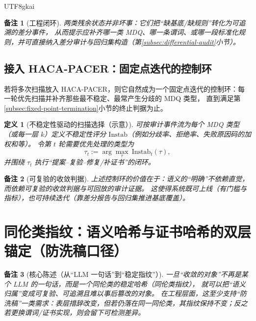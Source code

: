 \documentclass[12pt]{article}
\newtheorem{definition}{定义}[section]
\newtheorem{remark}{备注}[section]
\begin{document}
\begin{CJK*}{UTF8}{gkai}
\begin{remark}[工程闭环]
两类残余状态并非坏事：它们把“缺基底/缺规则”转化为可追溯的差分事件，
从而提示应补齐哪一类 MDQ、哪一条谓词、或哪一段标准化规则，并可直接纳入差分审计与回归集构造（第\ref{subsec:differential-audit}小节）。
\end{remark}

\subsection{接入 HACA-PACER：固定点迭代的控制环}
\label{subsec:haca-pacer-fixed-point-loop}

若将多次扫描放入 HACA-PACER，则它自然成为一个固定点迭代的控制环：每一轮优先扫描并补齐那些最不稳定、最常产生分歧的 MDQ 类型，
直到满足第\ref{subsec:fixed-point-termination}小节的终止判据为止。

\begin{definition}[不稳定性驱动的扫描选择（示意）]
可按审计事件流为每个 MDQ 类型（或每一层 $k$）定义不稳定性评分 $\mathrm{Instab}$（例如分歧率、拒绝率、失败原因码的加权和等）。
令第 $t$ 轮需要优先处理的类型为
\[
\tau_t:=\arg\max_{\tau}\ \mathrm{Instab}_t(\tau),
\]
并围绕 $\tau_t$ 执行“提案--复验--修复/补证书”的闭环。
\end{definition}

\begin{remark}[可复验的收敛判据]
上述控制环的价值在于：语义的“明确”不依赖直觉，而依赖可复验的收敛判据与可回放的审计证据。
这使得系统既可上线（有门槛与指标），也可持续迭代（靠差分报告与回归集推进基底覆盖）。
\end{remark}

\clearpage

\section{同伦类指纹：语义哈希与证书哈希的双层锚定（防洗稿口径）}
\label{sec:homotopy-fingerprint-hash}

\begin{remark}[核心陈述（从“LLM 一句话”到“稳定指纹”）]
一旦“收敛的对象”不再是某个 LLM 的一句话，而是一个同伦类的稳定哈希（同伦类指纹），
就可以把“语义归属”变成可复验、可追溯且难以事后篡改的对象。
在工程层面，这至少支持“防洗稿”一类需求：表层措辞改变，但若仍落在同一同伦类，其指纹保持不变；反之若更换谓词/证书实现，则会留下可检测差异。
\end{remark}


\end{CJK*}
\end{document}
